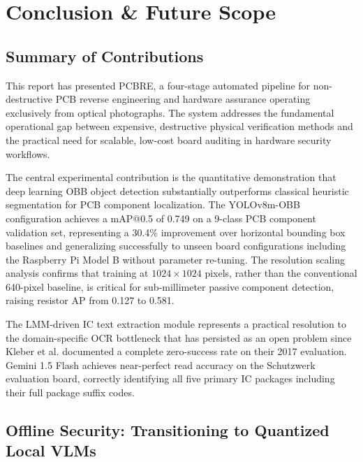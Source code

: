 \documentclass[12pt,a4paper]{report}
\begin{document}
\chapter{Conclusion \& Future Scope}
\label{chap:conclusion}

\section{Summary of Contributions}
\label{sec:summary}

This report has presented PCBRE, a four-stage automated pipeline for non-destructive PCB reverse engineering and hardware assurance operating exclusively from optical photographs. The system addresses the fundamental operational gap between expensive, destructive physical verification methods and the practical need for scalable, low-cost board auditing in hardware security workflows.

The central experimental contribution is the quantitative demonstration that deep learning OBB object detection substantially outperforms classical heuristic segmentation for PCB component localization. The YOLOv8m-OBB configuration achieves a mAP@0.5 of 0.749 on a 9-class PCB component validation set, representing a 30.4\% improvement over horizontal bounding box baselines and generalizing successfully to unseen board configurations including the Raspberry Pi Model B without parameter re-tuning. The resolution scaling analysis confirms that training at $1024 \times 1024$ pixels, rather than the conventional 640-pixel baseline, is critical for sub-millimeter passive component detection, raising resistor AP from 0.127 to 0.581.

The LMM-driven IC text extraction module represents a practical resolution to the domain-specific OCR bottleneck that has persisted as an open problem since Kleber et al. documented a complete zero-success rate on their 2017 evaluation. Gemini 1.5 Flash achieves near-perfect read accuracy on the Schutzwerk evaluation board, correctly identifying all five primary IC packages including their full package suffix codes.

\section{Offline Security: Transitioning to Quantized Local VLMs}
\label{sec:future_edge}
\end{document}
